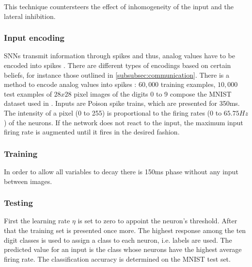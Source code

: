 This technique countersteers the effect of inhomogeneity of the input and the lateral inhibition.


\subsubsection{Input encoding}
\acp{SNN} transmit information through spikes and thus, analog values have to be encoded into spikes \cite{DIET_SNN}.
There are different types of encodings based on certain beliefs, 
for instance those outlined in \autoref{subsubsec:communication}.
There is a method to encode analog values into spikes \cite{SNN}:
$60,000$ training examples, $10,000$ test examples of $28x28$ pixel images of the digits 0 to 9 compose the MNIST dataset used in \cite{SNN}.
Inputs are Poison spike trains, which are presented for 350ms.
The intensity of a pixel (0 to 255) is proportional to the firing rates (0 to $65.75 Hz$) of the neurons.
If the network does not react to the input, the maximum input firing rate is augmented until it fires in the desired fashion. 


\subsubsection{Training}
In order to allow all variables to decay there is 150ms phase without any input between images.

\subsubsection{Testing}
First the learning rate $\eta$ is set to zero to appoint the neuron's threshold.
After that the training set is presented once more.
The highest response among the ten digit classes is used to assign a class to each neuron, i.e. labels are used.
The predicted value for an input is the class whose neurons have the highest average firing rate.
The classification accuracy is determined on the MNIST test set.